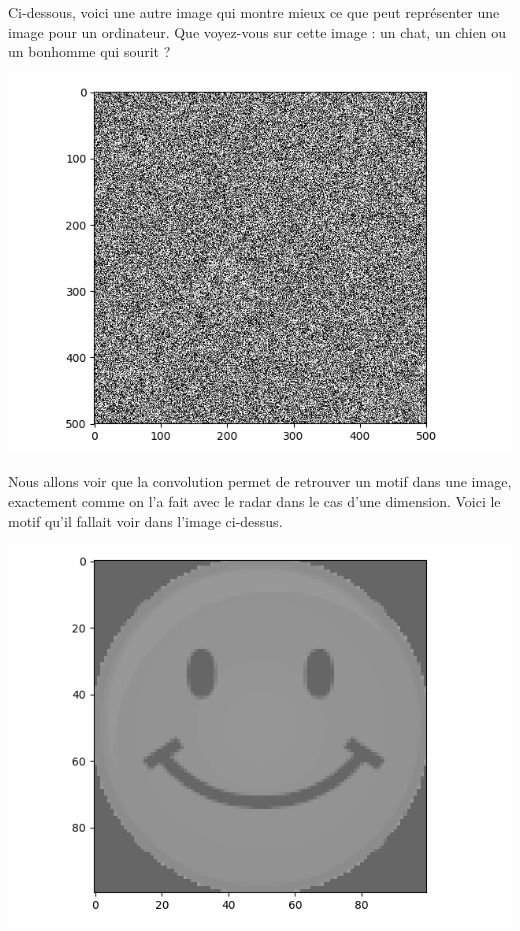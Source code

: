 \documentclass[11pt,class=report,crop=false]{standalone}
\begin{document}
Ci-dessous, voici une autre image qui montre mieux ce que peut représenter une image pour 
un ordinateur. Que voyez-vous sur cette image : un chat, un chien ou un bonhomme qui sourit ?

\begin{center}
\includegraphics[scale=\myscale,scale=0.5]{figures/correlation2d-3}
\end{center}


Nous allons voir que la convolution permet de retrouver un motif dans une image, exactement comme on l'a fait avec le radar dans le cas d'une dimension.
Voici le motif qu'il fallait \og{}voir\fg{} dans l'image ci-dessus.
\begin{center}
\includegraphics[scale=\myscale,scale=0.3]{figures/correlation2d-1}
\end{center}
\end{document}
